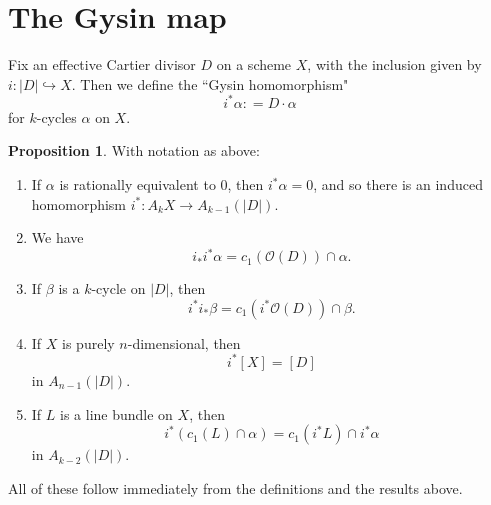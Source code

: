 \documentclass[12pt]{article}
\theoremstyle{definition}
\theoremstyle{theorem}
\newtheorem{prop}[defn]{Proposition}
\renewcommand{\O}{\mathcal O}
\newcommand{\1}{\mathbbm 1}
\newcommand{\inject}{\hookrightarrow}
\begin{document}
\section{The Gysin map}
Fix an effective Cartier divisor $D$ on a scheme $X$, with the inclusion given by $i: |D| \inject X$. Then we define the ``Gysin homomorphism" \[ i^* \alpha : = D \cdot \alpha \] for $k$-cycles $\alpha$ on $X$.

\begin{prop}
With notation as above:
\begin{enumerate}[{{\em(\hspace{-1pt}}}a{\em)}]
\item If $\alpha$ is rationally equivalent to $0$, then $i^* \alpha = 0$, and so there is an induced homomorphism $i^*: A_k X \to A_{k-1} (|D|)$.
\item We have \[ i_* i^* \alpha = c_1(\O(D)) \cap \alpha . \]
\item If $\beta$ is a $k$-cycle on $|D|$, then \[ i^* i_* \beta = c_1(i^* \O(D)) \cap \beta . \]
\item If $X$ is purely $n$-dimensional, then \[ i^* [X] = [D] \] in $A_{n-1} (|D|)$.
\item If $L$ is a line bundle on $X$, then \[ i^* (c_1(L) \cap \alpha) = c_1(i^* L) \cap i^* \alpha \] in $A_{k-2} (|D|)$.
\end{enumerate}
\end{prop}
All of these follow immediately from the definitions and the results above.
\end{document}

